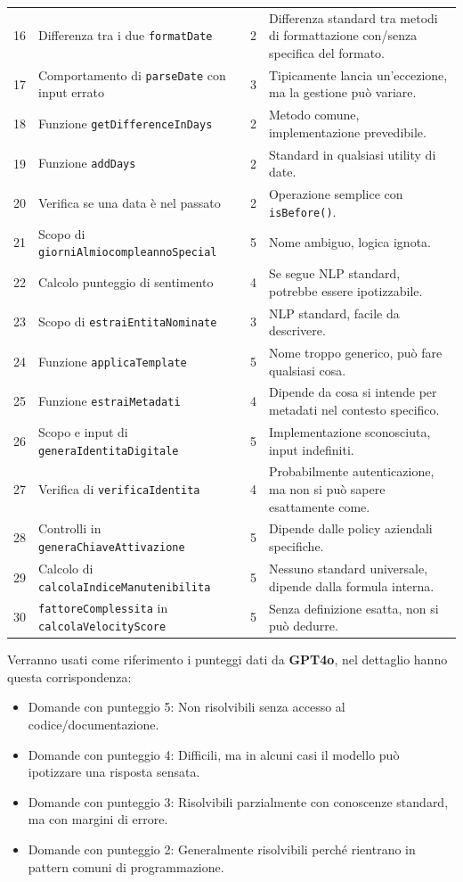 \documentclass[12pt,a4paper,openright,twoside]{book}
\begin{document}
\begin{longtable}{c L{6cm} c L{6cm}}
    16 & Differenza tra i due \texttt{formatDate} & 2 & Differenza standard tra metodi di formattazione con/senza specifica del formato. \\
    17 & Comportamento di \texttt{parseDate} con input errato & 3 & Tipicamente lancia un'eccezione, ma la gestione pu\`o variare. \\
    18 & Funzione \texttt{getDifferenceInDays} & 2 & Metodo comune, implementazione prevedibile. \\
    19 & Funzione \texttt{addDays} & 2 & Standard in qualsiasi utility di date. \\
    20 & Verifica se una data \`e nel passato & 2 & Operazione semplice con \texttt{isBefore()}. \\
    21 & Scopo di \texttt{giorniAlmiocompleannoSpecial} & 5 & Nome ambiguo, logica ignota. \\
    22 & Calcolo punteggio di sentimento & 4 & Se segue NLP standard, potrebbe essere ipotizzabile. \\
    23 & Scopo di \texttt{estraiEntitaNominate} & 3 & NLP standard, facile da descrivere. \\
    24 & Funzione \texttt{applicaTemplate} & 5 & Nome troppo generico, pu\`o fare qualsiasi cosa. \\
    25 & Funzione \texttt{estraiMetadati} & 4 & Dipende da cosa si intende per metadati nel contesto specifico. \\
    26 & Scopo e input di \texttt{generaIdentitaDigitale} & 5 & Implementazione sconosciuta, input indefiniti. \\
    27 & Verifica di \texttt{verificaIdentita} & 4 & Probabilmente autenticazione, ma non si pu\`o sapere esattamente come. \\
    28 & Controlli in \texttt{generaChiaveAttivazione} & 5 & Dipende dalle policy aziendali specifiche. \\
    29 & Calcolo di \texttt{calcolaIndiceManutenibilita} & 5 & Nessuno standard universale, dipende dalla formula interna. \\
    30 & \texttt{fattoreComplessita} in \texttt{calcolaVelocityScore} & 5 & Senza definizione esatta, non si pu\`o dedurre. \\
    \bottomrule
\end{longtable}
Verranno usati come riferimento i punteggi dati da \textbf{GPT4o}, nel dettaglio hanno questa corrispondenza:
\begin{itemize}
    \item Domande con punteggio 5: Non risolvibili senza accesso al codice/documentazione.
    \item Domande con punteggio 4: Difficili, ma in alcuni casi il modello può ipotizzare una risposta sensata.
    \item Domande con punteggio 3: Risolvibili parzialmente con conoscenze standard, ma con margini di errore.
    \item Domande con punteggio 2: Generalmente risolvibili perché rientrano in pattern comuni di programmazione.
\end{itemize}
\end{document}
